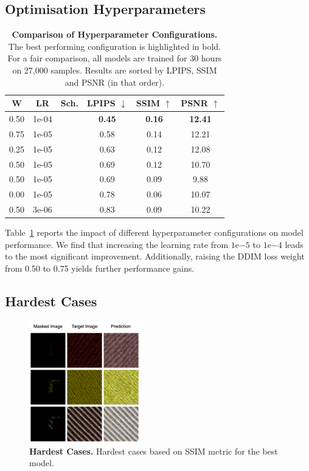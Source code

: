 \documentclass[11pt,twocolumn]{article}
\newcommand{\cmark}{\checkmark}
\newcommand{\xmark}{\ding{55}}
\begin{document}
\subsection{Optimisation Hyperparameters}
\begin{table}[t]
  \centering
  \begin{tabular}{ccc|ccc}
  \toprule
  \textbf{W} & \textbf{LR} & \textbf{Sch.} & \textbf{LPIPS} $\downarrow$ & \textbf{SSIM} $\uparrow$ & \textbf{PSNR} $\uparrow$ \\
  \midrule
  0.50 & 1e-04 & \xmark & \textbf{0.45} & \textbf{0.16} & \textbf{12.41} \\
  0.75 & 1e-05 & \xmark & 0.58 & 0.14 & 12.21 \\
  0.25 & 1e-05 & \xmark & 0.63 & 0.12 & 12.08 \\
  0.50 & 1e-05 & \cmark & 0.69 & 0.12 & 10.70 \\
  0.50 & 1e-05 & \xmark & 0.69 & 0.09 & 9.88 \\
  0.00 & 1e-05 & \xmark & 0.78 & 0.06 & 10.07 \\
  0.50 & 3e-06 & \xmark & 0.83 & 0.09 & 10.22 \\
  \bottomrule
  \end{tabular}
  \caption{\textbf{Comparison of Hyperparameter Configurations.} 
  The best performing configuration is highlighted in bold. For a 
  fair comparison, all models are trained for 30 hours on 27,000 samples. Results are sorted by LPIPS, SSIM and PSNR (in that order).}
  \label{tab:hyperparams}
\end{table}

Table~\ref{tab:hyperparams} reports the impact of different hyperparameter configurations on model performance. 
We find that increasing the learning rate from $1\text{e}{-5}$ to $1\text{e}{-4}$ leads to the most significant improvement. 
Additionally, raising the DDIM loss weight from 0.50 to 0.75 yields further performance gains.

\subsection{Hardest Cases}

\begin{figure}[t]
  \centering
  \includegraphics[width=0.43\textwidth]{figures/failure_cases.png}
  \caption{\textbf{Hardest Cases.} Hardest cases based on SSIM metric for the best model.}
  \label{fig:hardest-cases}
\end{figure}
\end{document}
